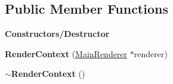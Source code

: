 \subsection*{Public Member Functions}
\begin{Indent}\textbf{ Constructors/\+Destructor}\par
\begin{DoxyCompactItemize}
\item 
\mbox{\label{classrev_1_1_render_context_a410668b7278c707fabeca2cb45aa4325}} 
{\bfseries Render\+Context} (\mbox{\hyperlink{classrev_1_1_main_renderer}{Main\+Renderer}} $\ast$renderer)
\item 
\mbox{\label{classrev_1_1_render_context_a23318071b0388176f055352fc2780340}} 
{\bfseries $\sim$\+Render\+Context} ()
\end{DoxyCompactItemize}
\end{Indent}
